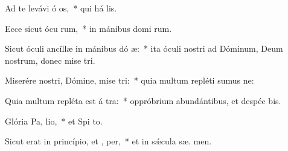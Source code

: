 \item Ad te levávi ó os,~* qui há  lis.
\item Ecce sicut ócu rum,~* in mánibus domi rum.
\item Sicut óculi ancíllæ in mánibus dó æ:~* ita óculi nostri ad Dóminum, Deum nostrum, donec mise tri.
\item Miserére nostri, Dómine, mise tri:~* quia multum repléti sumus ne:
\item Quia multum repléta est á tra:~* oppróbrium abundántibus, et despéc bis.
\item Glória Pa,  lio,~* et Spi to.
\item Sicut erat in princípio, et ,  per,~* et in sǽcula sæ. men.
